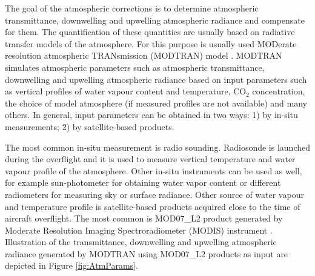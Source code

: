 The goal of the atmospheric corrections is to determine atmospheric transmittance, downwelling and upwelling atmospheric radiance and compensate for them. The quantification of these quantities are usually based on radiative transfer models of the atmosphere. For this purpose is usually used MODerate resolution atmospheric TRANsmission (MODTRAN) model \cite{BG06}. MODTRAN simulates atmospheric parameters such as atmospheric transmittance, downwelling and upwelling atmospheric radiance based on input parameters such as vertical profiles of water vapour content and temperature, CO$_2$ concentration, the choice of model atmosphere (if measured profiles are not available) and many others. In general, input parameters can be obtained in two ways: 1) by in-situ measurements; 2) by satellite-based products.

The most common in-situ measurement is radio sounding. Radiosonde is launched during the overflight and it is used to measure vertical temperature and water vapour profile of the atmosphere. Other in-situ instruments can be used as well, for example sun-photometer for obtaining water vapor content or different radiometers for measuring sky or surface radiance. Other source of water vapour and temperature profile is satellite-based products acquired close to the time of aircraft overflight. The most common is MOD07\_L2 product \cite{B11} generated by Moderate Resolution Imaging Spectroradiometer (MODIS) instrument \cite{M15}. Illustration of the transmittance, downwelling and upwelling atmospheric radiance generated by MODTRAN using MOD07\_L2 products as input are depicted in Figure \ref{fig:AtmParams}.

